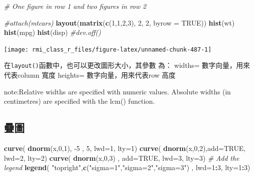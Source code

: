 \documentclass[]{book}
\newenvironment{Shaded}{\begin{snugshade}}{\end{snugshade}}
\newcommand{\CommentTok}[1]{\textcolor[rgb]{0.56,0.35,0.01}{\textit{#1}}}
\newcommand{\DataTypeTok}[1]{\textcolor[rgb]{0.13,0.29,0.53}{#1}}
\newcommand{\DecValTok}[1]{\textcolor[rgb]{0.00,0.00,0.81}{#1}}
\newcommand{\KeywordTok}[1]{\textcolor[rgb]{0.13,0.29,0.53}{\textbf{#1}}}
\newcommand{\NormalTok}[1]{#1}
\newcommand{\OperatorTok}[1]{\textcolor[rgb]{0.81,0.36,0.00}{\textbf{#1}}}
\newcommand{\OtherTok}[1]{\textcolor[rgb]{0.56,0.35,0.01}{#1}}
\newcommand{\StringTok}[1]{\textcolor[rgb]{0.31,0.60,0.02}{#1}}
\theoremstyle{definition}
\theoremstyle{definition}
\theoremstyle{definition}
\theoremstyle{remark}
\begin{document}
\begin{Shaded}
\begin{Highlighting}[]
\CommentTok{# One figure in row 1 and two figures in row 2}

\CommentTok{#attach(mtcars)}
\KeywordTok{layout}\NormalTok{(}\KeywordTok{matrix}\NormalTok{(}\KeywordTok{c}\NormalTok{(}\DecValTok{1}\NormalTok{,}\DecValTok{1}\NormalTok{,}\DecValTok{2}\NormalTok{,}\DecValTok{3}\NormalTok{), }\DecValTok{2}\NormalTok{, }\DecValTok{2}\NormalTok{, }\DataTypeTok{byrow =} \OtherTok{TRUE}\NormalTok{))}
\KeywordTok{hist}\NormalTok{(wt)}
\KeywordTok{hist}\NormalTok{(mpg)}
\KeywordTok{hist}\NormalTok{(disp)}
\CommentTok{#dev.off()}
\end{Highlighting}
\end{Shaded}

\begin{center}\texttt{[image: rmi\_class\_r\_files/figure-latex/unnamed-chunk-487-1]} \end{center}

在\texttt{layout()}函數中，也可以更改圖形大小，其參數 為： widths=
數字向量，用來代表column 寬度 heights= 數字向量，用來代表row 高度

note:Relative widths are specified with numeric values. Absolute widths
(in centimetres) are specified with the lcm() function.

\subsection{疊圖}

\begin{Shaded}
\begin{Highlighting}[]
\KeywordTok{curve}\NormalTok{( }\KeywordTok{dnorm}\NormalTok{(x,}\DecValTok{0}\NormalTok{,}\DecValTok{1}\NormalTok{), }\DecValTok{-5}\NormalTok{ , }\DecValTok{5}\NormalTok{, }\DataTypeTok{lwd=}\DecValTok{1}\NormalTok{, }\DataTypeTok{lty=}\DecValTok{1}\NormalTok{)}
\KeywordTok{curve}\NormalTok{( }\KeywordTok{dnorm}\NormalTok{(x,}\DecValTok{0}\NormalTok{,}\DecValTok{2}\NormalTok{),}\DataTypeTok{add=}\OtherTok{TRUE}\NormalTok{, }\DataTypeTok{lwd=}\DecValTok{2}\NormalTok{, }\DataTypeTok{lty=}\DecValTok{2}\NormalTok{)}
\KeywordTok{curve}\NormalTok{( }\KeywordTok{dnorm}\NormalTok{(x,}\DecValTok{0}\NormalTok{,}\DecValTok{3}\NormalTok{) , }\DataTypeTok{add=}\OtherTok{TRUE}\NormalTok{, }\DataTypeTok{lwd=}\DecValTok{3}\NormalTok{, }\DataTypeTok{lty=}\DecValTok{3}\NormalTok{)}
\CommentTok{# Add the legend}
\KeywordTok{legend}\NormalTok{( }\StringTok{"topright"}\NormalTok{,}\KeywordTok{c}\NormalTok{(}\StringTok{"sigma=1"}\NormalTok{,}\StringTok{"sigma=2"}\NormalTok{,}\StringTok{"sigma=3"}\NormalTok{) , }\DataTypeTok{lwd=}\DecValTok{1}\OperatorTok{:}\DecValTok{3}\NormalTok{, }\DataTypeTok{lty=}\DecValTok{1}\OperatorTok{:}\DecValTok{3}\NormalTok{)}
\end{Highlighting}
\end{Shaded}
\end{document}

